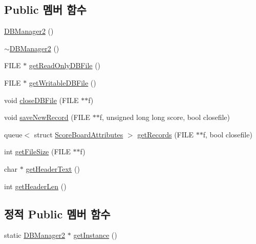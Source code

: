 \subsection*{Public 멤버 함수}
\begin{DoxyCompactItemize}
\item 
\hyperlink{class_tetris_1_1_d_b_management_1_1_d_b_manager2_a4f78fec881471a80eb86b55696af208a}{D\+B\+Manager2} ()
\item 
\hyperlink{class_tetris_1_1_d_b_management_1_1_d_b_manager2_aba92c26a0440d0785b3c725b60ebe32a}{$\sim$\+D\+B\+Manager2} ()
\item 
F\+I\+LE $\ast$ \hyperlink{class_tetris_1_1_d_b_management_1_1_d_b_manager2_a2d5133a870074bc297b8908856b9cd90}{get\+Read\+Only\+D\+B\+File} ()
\item 
F\+I\+LE $\ast$ \hyperlink{class_tetris_1_1_d_b_management_1_1_d_b_manager2_af2000011760bb3f7f3315d19e21372e0}{get\+Writable\+D\+B\+File} ()
\item 
void \hyperlink{class_tetris_1_1_d_b_management_1_1_d_b_manager2_aa275ad366e4301b97f26ebc799de7408}{close\+D\+B\+File} (F\+I\+LE $\ast$$\ast$f)
\item 
void \hyperlink{class_tetris_1_1_d_b_management_1_1_d_b_manager2_a25da0c1a6fa64b669f7e793c846961db}{save\+New\+Record} (F\+I\+LE $\ast$$\ast$f, unsigned long long score, bool closefile)
\item 
queue$<$ struct \hyperlink{struct_tetris_1_1_d_b_management_1_1_score_board_attributes}{Score\+Board\+Attributes} $>$ \hyperlink{class_tetris_1_1_d_b_management_1_1_d_b_manager2_a50f96af6082825b0a11b4090e9e863e1}{get\+Records} (F\+I\+LE $\ast$$\ast$f, bool closefile)
\item 
int \hyperlink{class_tetris_1_1_d_b_management_1_1_d_b_manager2_a0ad4e60d498caefce46d9917f7593c9e}{get\+File\+Size} (F\+I\+LE $\ast$$\ast$f)
\item 
char $\ast$ \hyperlink{class_tetris_1_1_d_b_management_1_1_d_b_manager2_a80b688a47f643121f2391f858d61ea13}{get\+Header\+Text} ()
\item 
int \hyperlink{class_tetris_1_1_d_b_management_1_1_d_b_manager2_acac0c763f7ff5fe5c5eda0c83e0b41bd}{get\+Header\+Len} ()
\end{DoxyCompactItemize}
\subsection*{정적 Public 멤버 함수}
\begin{DoxyCompactItemize}
\item 
static \hyperlink{class_tetris_1_1_d_b_management_1_1_d_b_manager2}{D\+B\+Manager2} $\ast$ \hyperlink{class_tetris_1_1_d_b_management_1_1_d_b_manager2_a5055491557a2202e0e84bb0688532a23}{get\+Instance} ()
\end{DoxyCompactItemize}
